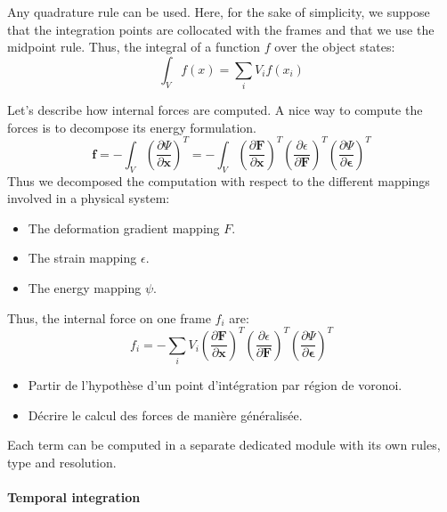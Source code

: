 \documentclass[11pt, oneside, a4paper]{memoir}
\begin{document}
Any quadrature rule can be used. Here, for the sake of simplicity, we suppose that the integration points are collocated with the frames and that we use the midpoint rule. Thus, the integral of a function $f$ over the object states:
\begin{equation}
\int_{V} f(x)  = \sum_{i} V_{i} f(x_{i})
\end{equation}

Let's describe how internal forces are computed. A nice way to compute the forces is to decompose its energy formulation.
\begin{equation}
\mathbf{f} = - \int_{V} \left( \frac{\partial \Psi}{\partial \mathbf{x}} \right)^{T} =
- \int_{V} 
\left( \frac{\partial \mathbf{F}}{\partial \mathbf{x}} \right)^{T}
\left( \frac{\partial \epsilon}{\partial \mathbf{F}} \right)^{T}
\left( \frac{\partial \Psi}{\partial \mathbf{\epsilon}} \right)^{T}
\end{equation}
Thus we decomposed the computation with respect to the different mappings involved in a physical system:
\begin{itemize}
\item The deformation gradient mapping $F$.
\item The strain mapping $\epsilon$.
\item The energy mapping $\psi$.
\end{itemize}

Thus, the internal force on one frame $f_{i}$ are:
\begin{equation}
f_{i} = - \sum_{i} V_{i} \left( \frac{\partial \mathbf{F}}{\partial \mathbf{x}} \right)^{T}
\left( \frac{\partial \epsilon}{\partial \mathbf{F}} \right)^{T}
\left( \frac{\partial \Psi}{\partial \mathbf{\epsilon}} \right)^{T}
\end{equation}

\begin{itemize}
\item Partir de l'hypothèse d'un point d'intégration par région de voronoi.
\item Décrire le calcul des forces de manière généralisée.
\end{itemize}

Each term can be computed in a separate dedicated module with its own rules, type and resolution.

\paragraph{Temporal integration}
\end{document}
